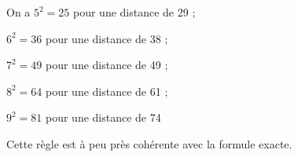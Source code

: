 \begin{enumerate}
On a $5^2 = 25$ pour une distance de 29 ;

$6^2 = 36$ pour une distance de 38 ;

$7^2 = 49$ pour une distance de 49 ;

$8^2 = 64$ pour une distance de 61 ; 

$9^2 = 81$ pour une distance de 74

Cette règle est à peu près cohérente avec la formule exacte.
\end{enumerate}

